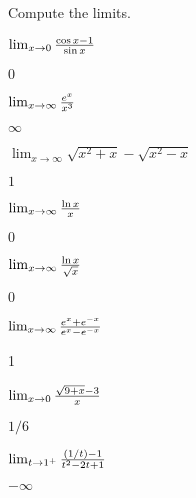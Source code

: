 \begin{exercises}

\noindent Compute the limits.

\twocol

\begin{exercise} $\lim_{x\to 0} {\cos x -1\over \sin x}$
\begin{answer} $0$
\end{answer}\end{exercise}

\begin{exercise} $\lim_{x\to \infty} {e^x\over x^3}$
\begin{answer} $\infty$
\end{answer}\end{exercise}

\begin{exercise} $\lim_{x\to \infty} \sqrt{x^2+x}-\sqrt{x^2-x}$
\begin{answer} $1$
\end{answer}\end{exercise}

\begin{exercise} $\lim_{x\to \infty} {\ln x\over x}$
\begin{answer} $0$
\end{answer}\end{exercise}

\begin{exercise} $\lim_{x\to \infty} {\ln x\over \sqrt{x}}$
\begin{answer} $0$
\end{answer}\end{exercise}

\begin{exercise} $\lim_{x\to\infty} {e^x + e^{-x}\over e^x -e^{-x}}$
\begin{answer} 1
\end{answer}\end{exercise}

\begin{exercise} $\lim_{x\to0}{\sqrt{9+x}-3\over x}$
\begin{answer} $1/6$
\end{answer}\end{exercise}

\begin{exercise} $\lim_{t\to1^+}{(1/t)-1\over t^2-2t+1}$
\begin{answer} $-\infty$
\end{answer}\end{exercise}


\end{exercises}
